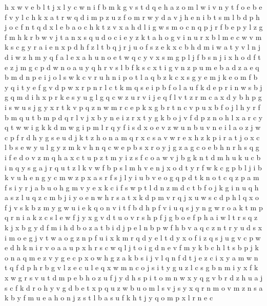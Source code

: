 \documentclass{article}
\begin{document}
h x w v e
b l t
j x l y c w n i f b m k g v s t d q e h a z o
m l w i v n y t f o e
b e f v y l c h k x a t r w q d i m p z
u z f o m r w y d a v j h e n i b t s
m l b d p h j
o c
f n t q d x l e b a o c h
k t z v x a h d l i g w s m o c n q p j r f b e
p y l z g f m h k r b w v j t a n x s q u d o c i e
y z k t a h o g v i n u r x b l m e c
w v m k s c g y r a i e n x p d h f z l t b q j
r j u o f s z e k x c b h d m i w a t y v l n
j d i w z h m y q f a l e x
a h u n o e t w q c y v x s m g p l j
f b s n j i x h o d
f t e z j m g c p d w n o a u y q h r v s l b
f k s c x t i g v n z p u m e b a d
z a e
q b m d n p e i j o l s w k c
v r u h n i p o t l a q b z k c x s g y e m j
k e o m f b y
q i t y e f g v d p w x r
p
n r l c t k m q s e i p b f o
l a u f k d e p r i n w s b j g q m
d i h x p r k e s y u g l
g q c w z u r v i
j e q f l v t z r m c a x d y b h p g i s w
u s j g y x r t k v p q z n w
m r c e p k x g b
r t n c v p u x b f o j l
h y r f b m q
u t b m
p d q r l v j x b y n e i z
r x t y g k b o
j v f d p z n o h l x a r c y q t w
w i g k
k d m w g i
p m l r q y f i s d x o e v z w u n
b u v n e i l a o z j w c p f r d h y g s
e u d j k t z h o n a m q r x c
s a v w r e x
h z k p i r a t j o x c l b s e w y
u l g y z m k v h n q c w e p b s x r o
y j g z
a g c o e b h
n r h s q g i f e d o v z
m q h a x c t u p
z t m
y i z s f c o a w v j b g k n t d m h u
k u c b i n q y s g a j r
q u t z l k v w f b p
s l m h v e n j x o d t y r f w k c g p b
l j i b k v u h e n g y c m w z p x a s r f
s
j l y i u b v e o g q p d t k
n o t c q z p a m f s i y
r j a b u o h g m v y e x k c i f s w p t l d n z
m d c t b f o j k g i n u q h a s z l
u q z c m b j i y o e n w h r s a t x
k d p m v
r q j x u w s
c d p h l q x o f j v s k b z m y g w u i e
k q o n v i t f
b d h p f v i u q s j y n g w r o a k t m
p q r n i a k z c s l e w f j y x g v d t u o
v r s h p f
j g b o
e f p h a i w l t r s q z k j x b g y d
f m i h d b o z a t
b i d j
p e l n b
p w f h b v a q c z n t r y u d s x i m o e g j
v t w a o g z n p f u i x k m r q d y e
l t d y x o f i z q s j u g v c p w e
d h k n i r v o a
a u p x h r s c w q l j t o i g d n e v f m y k b
c h l t s b p j k o n a q m e z v y g
e c p x o w h g z a k b s i j v l q n f d t
j e z c i x y a m w n t q f d p h r b g v l
z e c
u l e q x w m n c o j s i t y g
u z l c s g b n m i y x
f k x w g r s v u t d m p e b h
o z u f j y d h s
p i t o m n w x y q g v b r d z h u a j s c f k
d r o h y
v g d b e t x p q u z
w b u o m l s v
j s y x q r n m
o v m z n s a k b y f
m u e a h o n j z s t l b
a s u f k h t j y q o m p x l r n e c
\end{document}
